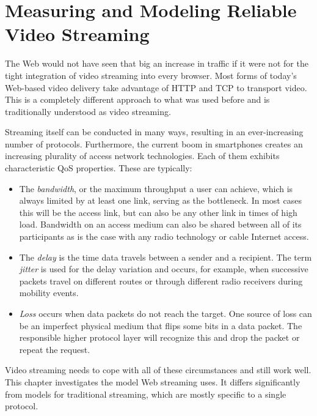 \chapter{Measuring and Modeling Reliable Video Streaming}
\label{chap:streaming}

The Web would not have seen that big an increase in traffic if it were not for the tight integration of video streaming into every browser. Most forms of today's Web-based video delivery take advantage of \gls{HTTP} and \gls{TCP} to transport video. This is a completely different approach to what was used before and is traditionally understood as video streaming.

Streaming itself can be conducted in many ways, resulting in an ever-increasing number of protocols. Furthermore, the current boom in smartphones creates an increasing plurality of access network technologies. Each of them exhibits characteristic \gls{QoS} properties. These are typically:

\begin{itemize}
	\item The \textit{bandwidth}, or the maximum throughput a user can achieve, which is always limited by at least one link, serving as the bottleneck. In most cases this will be the access link, but can also be any other link in times of high load. Bandwidth on an access medium can also be shared between all of its participants as is the case with any radio technology or cable Internet access.

	\item The \textit{delay} is the time data travels between a sender and a recipient. The term \textit{jitter} is used  for the delay variation and occurs, for example, when successive packets travel on different routes or through different radio receivers during mobility events.

	\item \textit{Loss} occurs when data packets do not reach the target. One source of loss can be an imperfect physical medium that flips some bits in a data packet. The responsible higher protocol layer will recognize this and drop the packet or repeat the request.
\end{itemize}

Video streaming needs to cope with all of these circumstances and still work well. This chapter investigates the model Web streaming uses. It differs significantly from models for traditional streaming, which are mostly specific to a single protocol.

